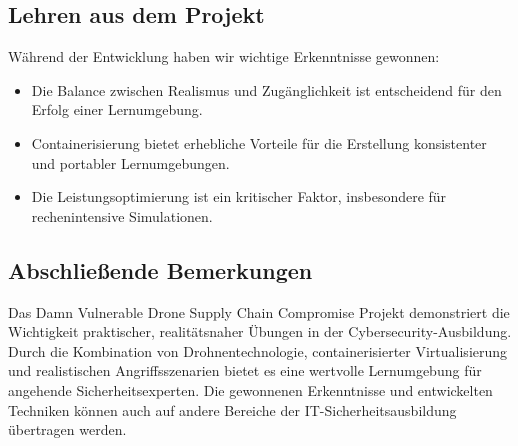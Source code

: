 \documentclass[12pt]{scrartcl}
\begin{document}
    \subsection{Lehren aus dem Projekt}
    
    Während der Entwicklung haben wir wichtige Erkenntnisse gewonnen:
    
    \begin{itemize}
        \item Die Balance zwischen Realismus und Zugänglichkeit ist entscheidend für den Erfolg einer Lernumgebung.
        
        \item Containerisierung bietet erhebliche Vorteile für die Erstellung konsistenter und portabler Lernumgebungen.
        
        \item Die Leistungsoptimierung ist ein kritischer Faktor, insbesondere für rechenintensive Simulationen.
    \end{itemize}
    
    \subsection{Abschließende Bemerkungen}
    
    Das Damn Vulnerable Drone Supply Chain Compromise Projekt demonstriert die Wichtigkeit praktischer, realitätsnaher Übungen in der Cybersecurity-Ausbildung. Durch die Kombination von Drohnentechnologie, containerisierter Virtualisierung und realistischen Angriffsszenarien bietet es eine wertvolle Lernumgebung für angehende Sicherheitsexperten. Die gewonnenen Erkenntnisse und entwickelten Techniken können auch auf andere Bereiche der IT-Sicherheitsausbildung übertragen werden.
\end{document}
